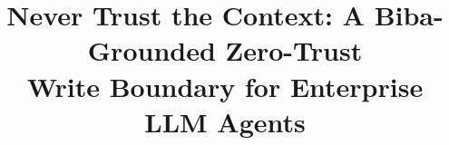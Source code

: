 \documentclass[conference,compsoc]{IEEEtran}
\begin{document}
\title{Never Trust the Context: A Biba-Grounded Zero-Trust\\
Write Boundary for Enterprise LLM Agents}

\author{}


\maketitle
\end{document}
